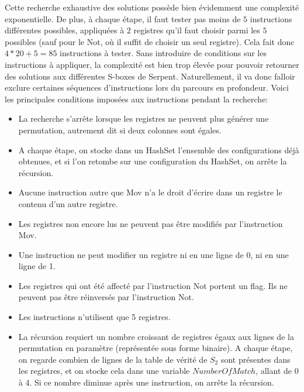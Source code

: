 \documentclass{article}
\begin{document}
Cette recherche exhaustive des solutions possède bien évidemment une complexité exponentielle. De plus, à chaque étape, il faut tester pas moins de $5$ instructions différentes possibles, appliquées à $2$ registres qu'il faut choisir parmi les $5$ possibles (sauf pour le Not, où il suffit de choisir un seul registre). Cela fait donc $4*20+5=85$ instructions à tester. Sans introduire de conditions sur les instructions à appliquer, la complexité est bien trop élevée pour pouvoir retourner des solutions aux différentes S-boxes de Serpent.
\medbreak
Naturellement, il va donc falloir exclure certaines séquences d'instructions lors du parcours en profondeur. Voici les principales conditions imposées aux instructions pendant la recherche:
\medbreak
\begin{itemize}
\setlength\itemsep{1em}
\item La recherche s'arrête lorsque les registres ne peuvent plus générer une permutation, autrement dit si deux colonnes sont égales.

\item A chaque étape, on stocke dans un HashSet l'ensemble des configurations déjà obtenues, et si l'on retombe sur une configuration du HashSet, on arrête la récursion.

\item Aucune instruction autre que Mov n'a le droit d'écrire dans un registre le contenu d'un autre registre.

\item Les registres non encore lus ne peuvent pas être modifiés par l'instruction Mov.

\item Une instruction ne peut modifier un registre ni en une ligne de 0, ni en une ligne de 1.
\item Les registres qui ont été affecté par l'instruction Not portent un flag. Ils ne peuvent pas être réinversés par l'instruction Not.

\item Les instructions n'utilisent que 5 registres.

\item La récursion requiert un nombre croissant de registres égaux aux lignes de la permutation en paramètre (représentée sous forme binaire). A chaque étape, on regarde combien de lignes de la table de vérité de $S_{2}$ sont présentes dans les registres, et on stocke cela dans une variable $NumberOfMatch$, allant de 0 à 4. Si ce nombre diminue après une instruction, on arrête la récursion.


\end{itemize}
\end{document}
